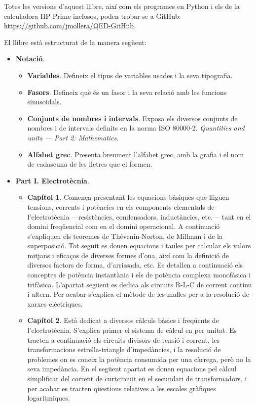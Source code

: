      Totes les versions d'aquest llibre, així com els programes en Python i els de la calculadora \textsf{HP Prime} inclosos, poden trobar-se a GitHub: \href{https://github.com/jmollera/QED-GitHub}{https://github.com/jmollera/QED-GitHub}.

	El llibre està estructurat de la manera següent:
	\begin{itemize}
		\item \textbf{Notació}.
		\begin{itemize}
			\item \textbf{Variables}. Defineix el tipus de variables usades i la seva tipografia.
			\item \textbf{Fasors}. Defineix què és un fasor i la seva relació amb les funcions sinusoidals.
			\item \textbf{Conjunts de nombres i intervals}. Exposa  els diversos conjunts de nombres i de intervals definits en la norma ISO 80000-2.
			\textit{Quantities and units --- Part 2: Mathematics}.
			\item \textbf{Alfabet grec}.  Presenta breument l'alfabet grec, amb la grafia i el nom de cadascuna de les lletres que el formen.
		\end{itemize}
		\item \textbf{Part I. Electrotècnia}. 
		\begin{itemize}
			\item \textbf{Capítol 1}. Comença presentant les equacions bàsiques que lliguen tensions, corrents i potències en els components elementals de l'electrotècnia ---resistències, condensadors, inductàncies, etc.--- tant en el domini freqüencial com en el domini operacional. A continuació s'expliquen els teoremes de Thévenin-Norton, de Millman i de la superposició. Tot seguit es donen equacions i taules per calcular els valors mitjans i eficaços de diverses formes d'ona, així com la definició de diversos factors de forma, d'arrissada, etc. Es detallen a continuació els conceptes de potència instantània i els de potència complexa monofàsica i trifàsica. L'apartat següent es dedica  als circuits R-L-C de corrent continu i altern. Per acabar s'explica el mètode de les malles per a la resolució de xarxes elèctriques.
			\item \textbf{Capítol 2}. Està dedicat a diversos càlculs bàsics i freqüents de l'electrotècnia. S'explica primer el sistema de càlcul en per unitat. Es tracten a continuació els circuits  divisors de tensió i corrent,  les transformacions estrella-triangle d'impedàncies, i la resolució de problemes on es coneix la potència consumida per una càrrega, però no la seva impedància. En el següent apartat es donen equacions pel càlcul simplificat del corrent de curtcircuit en el secundari de transformadors, i per acabar es tracten  qüestions relatives a les  escales gràfiques logarítmiques.

\end{itemize}
\end{itemize}
